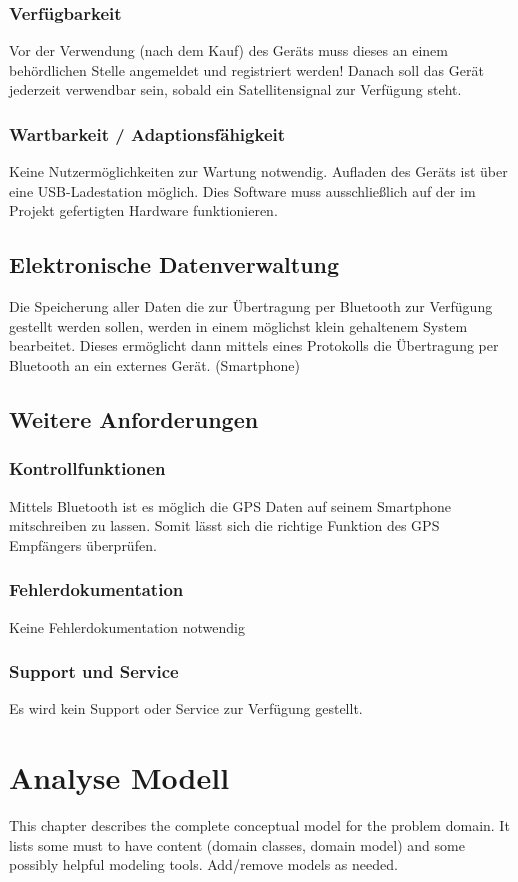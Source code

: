 \subsubsection{Verfügbarkeit}
Vor der Verwendung (nach dem Kauf) des Geräts muss dieses an einem behördlichen Stelle angemeldet und 
registriert werden!
Danach soll das Gerät jederzeit verwendbar sein, sobald ein Satellitensignal zur Verfügung steht.
\subsubsection{Wartbarkeit / Adaptionsfähigkeit}
Keine Nutzermöglichkeiten zur Wartung notwendig.
Aufladen des Geräts ist über eine USB-Ladestation möglich.
Dies Software muss ausschließlich auf der im Projekt gefertigten Hardware funktionieren.

\subsection{Elektronische Datenverwaltung}
Die Speicherung aller Daten die zur Übertragung per Bluetooth zur Verfügung gestellt werden sollen, werden in 
einem möglichst klein gehaltenem System bearbeitet. Dieses ermöglicht dann mittels eines Protokolls die Übertragung per Bluetooth an ein externes Gerät. (Smartphone)

\subsection{Weitere Anforderungen}
\subsubsection{Kontrollfunktionen}
Mittels Bluetooth ist es möglich die GPS Daten auf seinem Smartphone mitschreiben zu lassen.
Somit lässt sich die richtige Funktion des GPS Empfängers überprüfen.
\subsubsection{Fehlerdokumentation}
Keine Fehlerdokumentation notwendig
\subsubsection {Support und Service}
Es wird kein Support oder Service zur Verfügung gestellt.

\newpage

\section{Analyse Modell}
This chapter describes the complete conceptual model for the problem domain. It lists some must to have content (domain classes, domain model) and some possibly helpful modeling tools. Add/remove models as needed.

